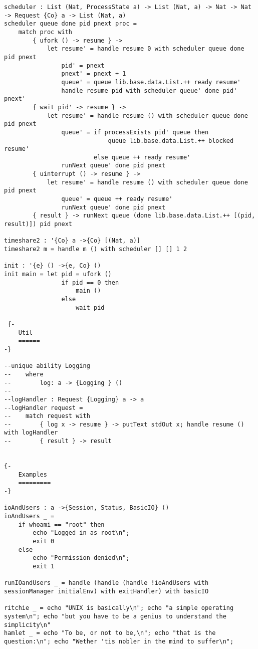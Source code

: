 \documentclass[logo,bsc,singlespacing,parskip]{infthesis}
\begin{document}
\begin{lstlisting}[language=unison]
scheduler : List (Nat, ProcessState a) -> List (Nat, a) -> Nat -> Nat -> Request {Co} a -> List (Nat, a)
scheduler queue done pid pnext proc =
    match proc with
        { ufork () -> resume } -> 
            let resume' = handle resume 0 with scheduler queue done pid pnext
                pid' = pnext 
                pnext' = pnext + 1
                queue' = queue lib.base.data.List.++ ready resume'
                handle resume pid with scheduler queue' done pid' pnext'
        { wait pid' -> resume } -> 
            let resume' = handle resume () with scheduler queue done pid pnext
                queue' = if processExists pid' queue then
                             queue lib.base.data.List.++ blocked resume'
                         else queue ++ ready resume'
                runNext queue' done pid pnext
        { uinterrupt () -> resume } -> 
            let resume' = handle resume () with scheduler queue done pid pnext
                queue' = queue ++ ready resume'
                runNext queue' done pid pnext
        { result } -> runNext queue (done lib.base.data.List.++ [(pid, result)]) pid pnext

timeshare2 : '{Co} a ->{Co} [(Nat, a)] 
timeshare2 m = handle m () with scheduler [] [] 1 2
 
init : '{e} () ->{e, Co} ()
init main = let pid = ufork ()
                if pid == 0 then 
                    main ()
                else 
                    wait pid
 
 {-
    Util 
    ======
-}

--unique ability Logging
--    where
--        log: a -> {Logging } ()
--
--logHandler : Request {Logging} a -> a
--logHandler request =
--    match request with
--        { log x -> resume } -> putText stdOut x; handle resume () with logHandler
--        { result } -> result


{-
    Examples
    =========
-}

ioAndUsers : a ->{Session, Status, BasicIO} ()
ioAndUsers _ = 
    if whoami == "root" then
        echo "Logged in as root\n";
        exit 0
    else
        echo "Permission denied\n";
        exit 1
    
runIOandUsers _ = handle (handle (handle !ioAndUsers with sessionManager initialEnv) with exitHandler) with basicIO
    
ritchie _ = echo "UNIX is basically\n"; echo "a simple operating system\n"; echo "but you have to be a genius to understand the simplicity\n"
hamlet _ = echo "To be, or not to be,\n"; echo "that is the question:\n"; echo "Wether 'tis nobler in the mind to suffer\n";


\end{lstlisting}
\end{document}
